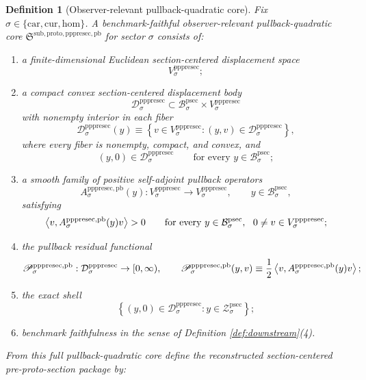 \documentclass[11pt]{article}
\newcommand{\Car}{\mathrm{car}}
\newcommand{\Cur}{\mathrm{cur}}
\newcommand{\Hom}{\mathrm{hom}}
\newcommand{\ProtoSectionBody}[1]{\mathcal B_{#1}^{\mathrm{psec}}}
\newcommand{\ProtoSectionShell}[1]{\mathcal Z_{#1}^{\mathrm{psec}}}
\newcommand{\PrePreProtoSectionPullbackCore}{\mathfrak S^{\mathrm{sub,proto,pppresec,pb}}}
\newcommand{\PrePreProtoSectionVertical}[1]{V_{#1}^{\mathrm{pppresec}}}
\newcommand{\PrePreProtoSectionResidualBody}[1]{\mathcal D_{#1}^{\mathrm{pppresec}}}
\newcommand{\PrePreProtoSectionPullbackOperator}[1]{A_{#1}^{\mathrm{pppresec,pb}}}
\newcommand{\PrePreProtoSectionPullbackFunctional}[1]{\mathscr P_{#1}^{\mathrm{pppresec,pb}}}
\newtheorem{definition}{Definition}
\begin{document}
\begin{definition}[Observer-relevant pullback-quadratic core]
\label{def:pullback}
Fix \(\sigma\in\{\Car,\Cur,\Hom\}\). A \emph{benchmark-faithful observer-relevant pullback-quadratic core} \(\PrePreProtoSectionPullbackCore\) for sector \(\sigma\) consists of:
\begin{enumerate}
    \item a finite-dimensional Euclidean section-centered displacement space
    \[
    \PrePreProtoSectionVertical{\sigma};
    \]
    \item a compact convex section-centered displacement body
    \[
    \PrePreProtoSectionResidualBody{\sigma}
    \subset
    \ProtoSectionBody{\sigma}\times\PrePreProtoSectionVertical{\sigma}
    \]
    with nonempty interior in each fiber
    \[
    \PrePreProtoSectionResidualBody{\sigma}(y)
    \equiv
    \left\{
    v\in\PrePreProtoSectionVertical{\sigma}:(y,v)\in\PrePreProtoSectionResidualBody{\sigma}
    \right\},
    \]
    where every fiber is nonempty, compact, and convex, and
    \[
    (y,0)\in\PrePreProtoSectionResidualBody{\sigma}
    \qquad
    \text{for every }
    y\in\ProtoSectionBody{\sigma};
    \]
    \item a smooth family of positive self-adjoint pullback operators
    \[
    \PrePreProtoSectionPullbackOperator{\sigma}(y):
    \PrePreProtoSectionVertical{\sigma}\to\PrePreProtoSectionVertical{\sigma},
    \qquad
    y\in\ProtoSectionBody{\sigma},
    \]
    satisfying
    \[
    \ev{v,\PrePreProtoSectionPullbackOperator{\sigma}(y)v}>0
    \qquad
    \text{for every }
    y\in\ProtoSectionBody{\sigma},
    \ \ 0\neq v\in\PrePreProtoSectionVertical{\sigma};
    \]
    \item the pullback residual functional
    \[
    \PrePreProtoSectionPullbackFunctional{\sigma}:
    \PrePreProtoSectionResidualBody{\sigma}\to[0,\infty),
    \qquad
    \PrePreProtoSectionPullbackFunctional{\sigma}(y,v)
    \equiv
    \frac{1}{2}
    \ev{v,\PrePreProtoSectionPullbackOperator{\sigma}(y)v};
    \]
    \item the exact shell
    \[
    \left\{
    (y,0)\in\PrePreProtoSectionResidualBody{\sigma}:y\in\ProtoSectionShell{\sigma}
    \right\};
    \]
    \item benchmark faithfulness in the sense of Definition \ref{def:downstream}(4).
\end{enumerate}
From this full pullback-quadratic core define the reconstructed section-centered pre-proto-section package by:
\begin{enumerate}

\end{enumerate}
\end{definition}
\end{document}
